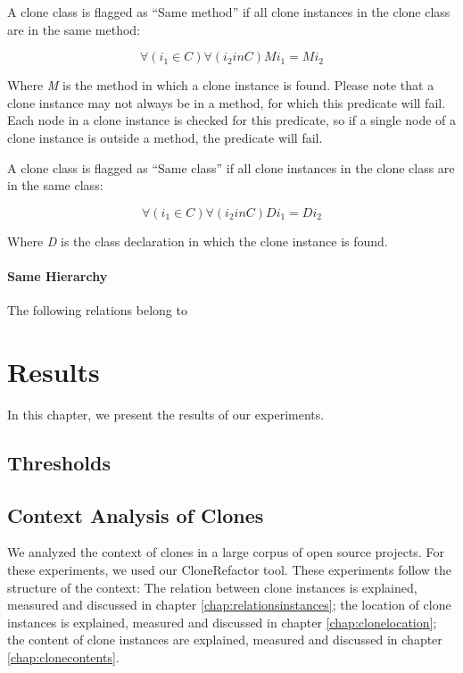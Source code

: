 A clone class is flagged as ``Same method'' if all clone instances in the clone class are in the same method:

\begin{equation}\label{eq:samemethod}
\forall (i_1 \in C) \forall (i_2 in C) Mi_1 = Mi_2
\end{equation}

Where \textit{M} is the method in which a clone instance is found. Please note that a clone instance may not always be in a method, for which this predicate will fail. Each node in a clone instance is checked for this predicate, so if a single node of a clone instance is outside a method, the predicate will fail.

A clone class is flagged as ``Same class'' if all clone instances in the clone class are in the same class:

\begin{equation}\label{eq:samemethod}
\forall (i_1 \in C) \forall (i_2 in C) Di_1 = Di_2
\end{equation}

Where \textit{D} is the class declaration in which the clone instance is found.

\subsubsection{Same Hierarchy}
The following relations belong to


\chapter{Results}

\label{ch:results}
In this chapter, we present the results of our experiments.

\section{Thresholds} \label{sec:thresholds}

\section{Context Analysis of Clones}\label{chap:clonecontextexpl}
We analyzed the context of clones in a large corpus of open source projects. For these experiments, we used our CloneRefactor tool. These experiments follow the structure of the context: The relation between clone instances is explained, measured and discussed in chapter \ref{chap:relationsinstances}; the location of clone instances is explained, measured and discussed in chapter \ref{chap:clonelocation};  the content of clone instances are explained, measured and discussed in chapter \ref{chap:clonecontents}.

